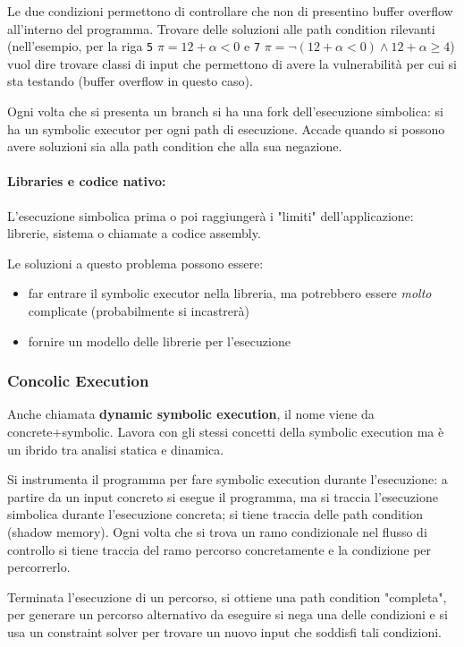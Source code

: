 Le due condizioni permettono di controllare che non di presentino buffer overflow all'interno del programma. Trovare delle soluzioni alle path condition rilevanti (nell'esempio, per la riga \texttt{5} $\pi  =12 + \alpha < 0$ e \texttt{7} $\pi = \neg (12 + \alpha < 0) \wedge 12 + \alpha \geq 4$) vuol dire trovare classi di input che permettono di avere la vulnerabilità per cui si sta testando (buffer overflow in questo caso).

Ogni volta che si presenta un branch si ha una fork dell'esecuzione simbolica: si ha un symbolic executor per ogni path di esecuzione. Accade quando si possono avere soluzioni sia alla path condition che alla sua negazione. 

\paragraph{Libraries e codice nativo:} L'esecuzione simbolica prima o poi raggiungerà i "limiti" dell'applicazione: librerie, sistema o chiamate a codice assembly. 

Le soluzioni a questo problema possono essere: 
\begin{itemize}
	\item far entrare il symbolic executor nella libreria, ma potrebbero essere \textit{molto} complicate (probabilmente si incastrerà)

	\item fornire un modello delle librerie per l'esecuzione
\end{itemize}

\subsubsection{Concolic Execution}

Anche chiamata \textbf{dynamic symbolic execution}, il nome viene da concrete+symbolic. Lavora con gli stessi concetti della symbolic execution ma è un ibrido tra analisi statica e dinamica.

Si instrumenta il programma per fare symbolic execution durante l'esecuzione: a partire da un input concreto si esegue il programma, ma si traccia l'esecuzione simbolica durante l'esecuzione concreta; si tiene traccia delle path condition (shadow memory). Ogni volta che si trova un ramo condizionale nel flusso di controllo si tiene traccia del ramo percorso concretamente e la condizione per percorrerlo.

Terminata l'esecuzione di un percorso, si ottiene una path condition "completa", per generare un percorso alternativo da eseguire si nega una delle condizioni e si usa un constraint solver per trovare un nuovo input che soddisfi tali condizioni.

